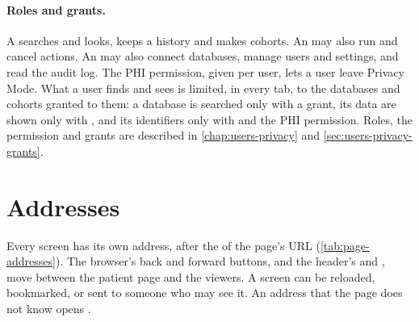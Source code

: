 \paragraph{Roles and grants.} A  searches and looks, keeps a history and makes
cohorts. An  may also run and cancel actions. An  may also connect
databases, manage users and settings, and read the audit log. The PHI permission, given per user,
lets a user leave Privacy Mode. What a user finds and sees is limited, in every tab, to the
databases and cohorts granted to them: a database is searched only with a  grant,
its data are shown only with , and its identifiers only with  and the PHI
permission. Roles, the permission and grants are described in \cref{chap:users-privacy} and
\cref{sec:users-privacy-grants}.

\section{Addresses}
\label{sec:page-addresses}

Every screen has its own address, after the \code{\#} of the page's URL
(\cref{tab:page-addresses}). The browser's back and forward buttons, and the header's
\ui{$\langle$} and \ui{$\rangle$}, move between the patient page and the viewers. A screen can be
reloaded, bookmarked, or sent to someone who may see it. An address that the page does not know
opens .

